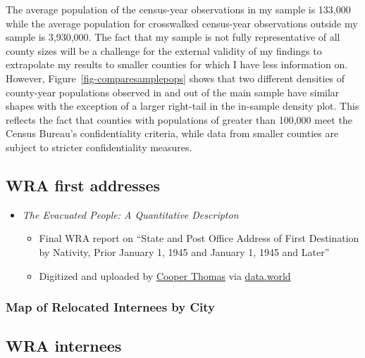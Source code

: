 \documentclass[12pt]{article}
\begin{document}
The average population of the census-year observations in my sample is
133,000 while the average population for
crosswalked census-year observations outside my sample is
3,930,000. The fact that my sample is not
fully representative of all county sizes will be a challenge for the
external validity of my findings to extrapolate my results to smaller
counties for which I have less information on. However,
Figure~\ref{fig-comparesamplepops} shows that two different densities of
county-year populations observed in and out of the main sample have
similar shapes with the exception of a larger right-tail in the
in-sample density plot. This reflects the fact that counties with
populations of greater than 100,000 meet the Census Bureau's
confidentiality criteria, while data from smaller counties are subject
to stricter confidentiality measures.

\subsection{WRA first addresses}\label{wra-first-addresses}

\begin{itemize}

\item
  {\emph{The Evacuated People: A Quantitative Descripton}}
  \cite{krug_evacuated_1946}

  \begin{itemize}
  
  \item
    Final WRA report on ``State and Post Office Address of First
    Destination by Nativity, Prior January 1, 1945 and January 1, 1945
    and Later''
  \item
    Digitized and uploaded by \href{https://cooper-thomas.com/}{Cooper Thomas} via
    \href{https://data.world/infinitecoop/japanese-internment-camps}{data.world}
  \end{itemize}
\end{itemize}

\subsubsection{Map of Relocated Internees by
City}\label{map-of-relocated-internees-by-city}

\subsection{WRA internees}\label{wra-internees}
\end{document}
